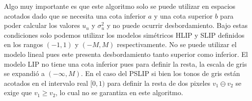 Algo muy importante es que este algoritmo solo se puede utilizar en espacios acotados dado que se necesita una cota inferior $a$ y una cota superior $b$ para poder calcular los valores $u_u$ y $\sigma_u^2$ y no puede ocurrir desbordamiento. Bajo estas condiciones solo podemos utilizar los modelos sim\'etricos HLIP y SLIP definidos en los rangos $(-1,1)$ y $(- M, M)$ respectivamente. No se puede utilizar el modelo lineal pues este presenta desbordamiento tanto superior como inferior. El modelo LIP no tiene una cota inferior pues para definir la resta, la escala de gris se expandi\'o a $(-\infty,M)$. En el caso del PSLIP si bien los tonos de gris est\'an acotados en el intervalo real $[0,1)$ para definir la resta de dos pixeles $v_1\ominus v_2$ se exige que $v_1\geq v_2$, lo cual no se garantiza en este algoritmo.